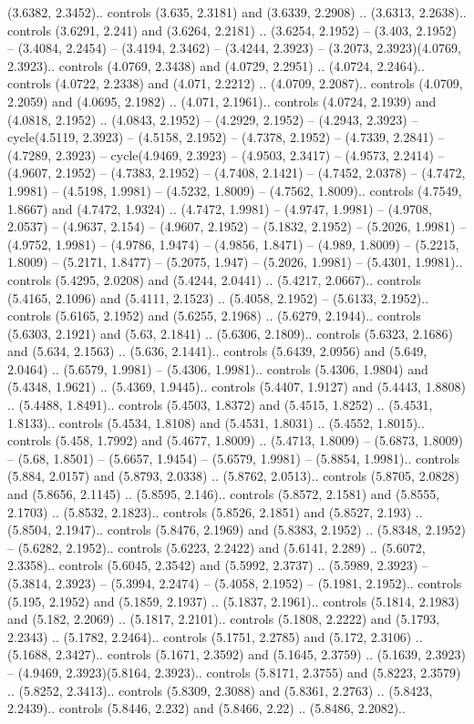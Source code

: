 (3.6382, 2.3452).. controls (3.635, 2.3181) and (3.6339, 2.2908) .. (3.6313, 2.2638).. controls (3.6291, 2.241) and (3.6264, 2.2181) .. (3.6254, 2.1952) -- (3.403, 2.1952) -- (3.4084, 2.2454) -- (3.4194, 2.3462) -- (3.4244, 2.3923) -- (3.2073, 2.3923)(4.0769, 2.3923).. controls (4.0769, 2.3438) and (4.0729, 2.2951) .. (4.0724, 2.2464).. controls (4.0722, 2.2338) and (4.071, 2.2212) .. (4.0709, 2.2087).. controls (4.0709, 2.2059) and (4.0695, 2.1982) .. (4.071, 2.1961).. controls (4.0724, 2.1939) and (4.0818, 2.1952) .. (4.0843, 2.1952) -- (4.2929, 2.1952) -- (4.2943, 2.3923) -- cycle(4.5119, 2.3923) -- (4.5158, 2.1952) -- (4.7378, 2.1952) -- (4.7339, 2.2841) -- (4.7289, 2.3923) -- cycle(4.9469, 2.3923) -- (4.9503, 2.3417) -- (4.9573, 2.2414) -- (4.9607, 2.1952) -- (4.7383, 2.1952) -- (4.7408, 2.1421) -- (4.7452, 2.0378) -- (4.7472, 1.9981) -- (4.5198, 1.9981) -- (4.5232, 1.8009) -- (4.7562, 1.8009).. controls (4.7549, 1.8667) and (4.7472, 1.9324) .. (4.7472, 1.9981) -- (4.9747, 1.9981) -- (4.9708, 2.0537) -- (4.9637, 2.154) -- (4.9607, 2.1952) -- (5.1832, 2.1952) -- (5.2026, 1.9981) -- (4.9752, 1.9981) -- (4.9786, 1.9474) -- (4.9856, 1.8471) -- (4.989, 1.8009) -- (5.2215, 1.8009) -- (5.2171, 1.8477) -- (5.2075, 1.947) -- (5.2026, 1.9981) -- (5.4301, 1.9981).. controls (5.4295, 2.0208) and (5.4244, 2.0441) .. (5.4217, 2.0667).. controls (5.4165, 2.1096) and (5.4111, 2.1523) .. (5.4058, 2.1952) -- (5.6133, 2.1952).. controls (5.6165, 2.1952) and (5.6255, 2.1968) .. (5.6279, 2.1944).. controls (5.6303, 2.1921) and (5.63, 2.1841) .. (5.6306, 2.1809).. controls (5.6323, 2.1686) and (5.634, 2.1563) .. (5.636, 2.1441).. controls (5.6439, 2.0956) and (5.649, 2.0464) .. (5.6579, 1.9981) -- (5.4306, 1.9981).. controls (5.4306, 1.9804) and (5.4348, 1.9621) .. (5.4369, 1.9445).. controls (5.4407, 1.9127) and (5.4443, 1.8808) .. (5.4488, 1.8491).. controls (5.4503, 1.8372) and (5.4515, 1.8252) .. (5.4531, 1.8133).. controls (5.4534, 1.8108) and (5.4531, 1.8031) .. (5.4552, 1.8015).. controls (5.458, 1.7992) and (5.4677, 1.8009) .. (5.4713, 1.8009) -- (5.6873, 1.8009) -- (5.68, 1.8501) -- (5.6657, 1.9454) -- (5.6579, 1.9981) -- (5.8854, 1.9981).. controls (5.884, 2.0157) and (5.8793, 2.0338) .. (5.8762, 2.0513).. controls (5.8705, 2.0828) and (5.8656, 2.1145) .. (5.8595, 2.146).. controls (5.8572, 2.1581) and (5.8555, 2.1703) .. (5.8532, 2.1823).. controls (5.8526, 2.1851) and (5.8527, 2.193) .. (5.8504, 2.1947).. controls (5.8476, 2.1969) and (5.8383, 2.1952) .. (5.8348, 2.1952) -- (5.6282, 2.1952).. controls (5.6223, 2.2422) and (5.6141, 2.289) .. (5.6072, 2.3358).. controls (5.6045, 2.3542) and (5.5992, 2.3737) .. (5.5989, 2.3923) -- (5.3814, 2.3923) -- (5.3994, 2.2474) -- (5.4058, 2.1952) -- (5.1981, 2.1952).. controls (5.195, 2.1952) and (5.1859, 2.1937) .. (5.1837, 2.1961).. controls (5.1814, 2.1983) and (5.182, 2.2069) .. (5.1817, 2.2101).. controls (5.1808, 2.2222) and (5.1793, 2.2343) .. (5.1782, 2.2464).. controls (5.1751, 2.2785) and (5.172, 2.3106) .. (5.1688, 2.3427).. controls (5.1671, 2.3592) and (5.1645, 2.3759) .. (5.1639, 2.3923) -- (4.9469, 2.3923)(5.8164, 2.3923).. controls (5.8171, 2.3755) and (5.8223, 2.3579) .. (5.8252, 2.3413).. controls (5.8309, 2.3088) and (5.8361, 2.2763) .. (5.8423, 2.2439).. controls (5.8446, 2.232) and (5.8466, 2.22) .. (5.8486, 2.2082).. 